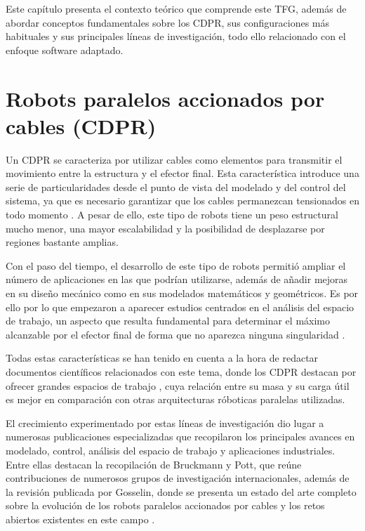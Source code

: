 \vspace{0.25cm}

Este capítulo presenta el contexto teórico que comprende este TFG, además de abordar conceptos fundamentales sobre los CDPR, sus configuraciones más habituales y sus principales líneas de investigación, todo ello relacionado con el enfoque software adaptado.

\section{Robots paralelos accionados por cables (CDPR)}
\label{sec:segundaseccion}

Un CDPR se caracteriza por utilizar cables como elementos para transmitir el movimiento entre la estructura y el efector final. Esta característica introduce una serie de particularidades desde el punto de vista del modelado y del control del sistema, ya que es necesario garantizar que los cables permanezcan tensionados en todo momento \cite{behzadipour2005stiffness,gouttefarde2015tension}. A pesar de ello, este tipo de robots tiene un peso estructural mucho menor, una mayor escalabilidad y la posibilidad de desplazarse por regiones bastante amplias.

\vspace{0.25cm}

Con el paso del tiempo, el desarrollo de este tipo de robots permitió ampliar el número de aplicaciones en las que podrían utilizarse, además de añadir mejoras en su diseño mecánico como en sus modelados matemáticos y geométricos. Es por ello por lo que empezaron a aparecer estudios centrados en el análisis del espacio de trabajo, un aspecto que resulta fundamental para determinar el máximo alcanzable por el efector final de forma que no aparezca ninguna singularidad \cite{verhoeven2004}.

\vspace{0.25cm}

Todas estas características se han tenido en cuenta a la hora de redactar documentos científicos relacionados con este tema, donde los CDPR destacan por ofrecer grandes espacios de trabajo \cite{fattah2005design}, cuya relación entre su masa y su carga útil \cite{pott2018cdpr,merlet2006parallel,fattah2005design,carpio2019modeling} es mejor en comparación con otras arquitecturas róboticas paralelas utilizadas.

\vspace{0.25cm}

El crecimiento experimentado por estas líneas de investigación dio lugar a numerosas publicaciones especializadas que recopilaron los principales avances en modelado, control, análisis del espacio de trabajo y aplicaciones industriales. Entre ellas destacan la recopilación de Bruckmann y Pott, que reúne contribuciones de numerosos grupos de investigación internacionales, además de la revisión publicada por Gosselin, donde se presenta un estado del arte completo sobre la evolución de los robots paralelos accionados por cables y los retos abiertos existentes en este campo \cite{gosselin2014, bruckmann2013}.

